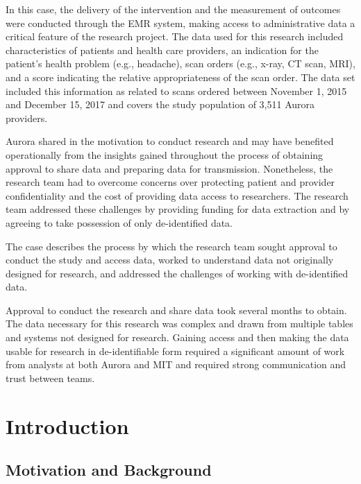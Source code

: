 In this case, the delivery of the intervention and the measurement of outcomes were conducted through the EMR system, making access to administrative data a critical feature of the research project. The data used for this research included characteristics of patients and health care providers, an indication for the patient's health problem (e.g., headache), scan orders (e.g., x-ray, CT scan, MRI), and a score indicating the relative appropriateness of the scan order. The data set included this information as related to scans ordered between November 1, 2015 and December 15, 2017 and covers the study population of 3,511 Aurora providers.

Aurora shared in the motivation to conduct research and may have benefited operationally from the insights gained throughout the process of obtaining approval to share data and preparing data for transmission. Nonetheless, the research team had to overcome concerns over protecting patient and provider confidentiality and the cost of providing data access to researchers. The research team addressed these challenges by providing funding for data extraction and by agreeing to take possession of only de-identified data.

The case describes the process by which the research team sought approval to conduct the study and access data, worked to understand data not originally designed for research, and addressed the challenges of working with de-identified data.

Approval to conduct the research and share data took several months to obtain. The data necessary for this research was complex and drawn from multiple tables and systems not designed for research. Gaining access and then making the data usable for research in de-identifiable form required a significant amount of work from analysts at both Aurora and MIT and required strong communication and trust between teams.

\hypertarget{introduction-5}{%
\section{Introduction}\label{introduction-5}}

\hypertarget{motivation-and-background-3}{%
\subsection{Motivation and Background}\label{motivation-and-background-3}}

